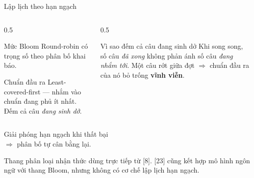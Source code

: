 \documentclass[aspectratio=169,11pt]{beamer}
\renewcommand{\cite}[1]{\textcolor{cMuted}{[#1]}}
\newcommand{\srcnote}[1]{\vfill{\scriptsize\color{cMuted}#1\par}}
\newcommand{\punch}[1]{\begin{center}\alert{\large #1}\end{center}}
\newcommand{\dg}{\;\raisebox{0.15ex}{\colorbox{cAccent}{\color{white}\scriptsize\bfseries\,ĐÓNG GÓP\,}}}
\begin{document}
\begin{frame}{Lập lịch theo hạn ngạch \dg}
  \vfill
  \begin{columns}[T]
    \begin{column}{0.5\textwidth}
      \begin{block}{Mức Bloom}
        \alert{Round-robin có trọng số} theo phân bố khai báo.
      \end{block}
      \begin{block}{Chuẩn đầu ra}
        \alert{Least-covered-first} --- nhắm vào chuẩn đang phủ ít nhất.
        \smallskip
        Đếm cả câu \emph{đang sinh dở}.
      \end{block}
    \end{column}
    \begin{column}{0.5\textwidth}
      \begin{alertblock}{Vì sao đếm cả câu đang sinh dở}
        Khi song song, số câu \emph{đã xong} không phản ánh số câu \emph{đang nhắm tới}.
        \smallskip
        Một câu rớt giữa đợt $\Rightarrow$ chuẩn đầu ra của nó bỏ trống \textbf{vĩnh viễn}.
      \end{alertblock}
    \end{column}
  \end{columns}
  \vfill
  \punch{Giải phóng hạn ngạch khi thất bại\\[0.2em] $\Rightarrow$ phân bố tự cân bằng lại.}
  \vfill
  \srcnote{Thang phân loại nhận thức dùng trực tiếp từ \cite{8}. \quad \cite{23} cũng kết hợp mô hình ngôn ngữ với thang Bloom, nhưng không có cơ chế lập lịch hạn ngạch.}
\end{frame}
\end{document}
